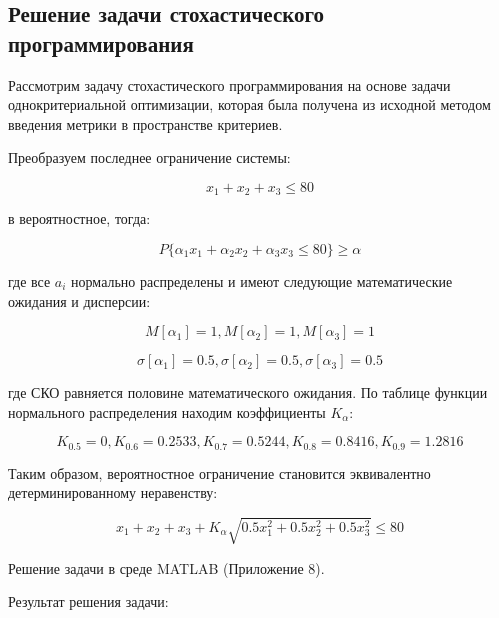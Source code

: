 \subsection{Решение задачи стохастического программирования}

Рассмотрим задачу стохастического программирования на основе задачи однокритериальной оптимизации, которая была получена из исходной методом введения метрики в пространстве критериев.

Преобразуем последнее ограничение системы:

\begin{equation*}
\text{$x_1+x_2+x_3\leq 80$}
\end{equation*}

в вероятностное, тогда:

\begin{equation*}
\text{$P\{\alpha_1x_1+\alpha_2x_2+\alpha_3x_3\leq 80\}\geq \alpha$}
\end{equation*}

где все $a_i$ нормально распределены и имеют следующие математические ожидания и дисперсии:

\begin{equation*}
\text{$M[\alpha_1]=1, M[\alpha_2]=1, M[\alpha_3]=1$}
\end{equation*}

\begin{equation*}
\text{$\sigma[\alpha_1]=0.5, \sigma[\alpha_2]=0.5, \sigma[\alpha_3]=0.5$}
\end{equation*}

где СКО равняется половине математического ожидания. По таблице функции нормального распределения находим коэффициенты $K_\alpha$:

\begin{equation*}
\text{$K_{0.5}=0, K_{0.6}=0.2533, K_{0.7}=0.5244, K_{0.8}=0.8416, K_{0.9}=1.2816$}
\end{equation*}

Таким образом, вероятностное ограничение становится эквивалентно детерминированному неравенству:

\begin{equation*}
\text{$x_1+x_2+x_3+K_\alpha \sqrt{0.5x_1^2+0.5x_2^2+0.5x_3^2}\leq 80$}
\end{equation*}

Решение задачи в среде MATLAB (Приложение 8).

Результат решения задачи:



